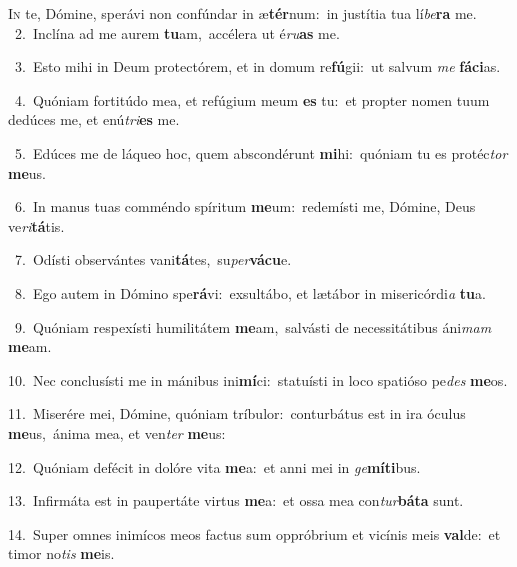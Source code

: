 \lettrine{\initial\textcolor{\initialcolor}{I}}{n} te, Dómine, sperávi non confúndar in æ\-\textbf{tér}\-num:~\star in justítia tua lí\-\textit{be}\-\textbf{ra} me.\\
{\numbfont\textcolor{\numbcolor}{~2.}}~Inclína ad me aurem \textbf{tu}\-am,~\star accélera ut é\-\textit{ru}\-\textbf{as} me.\par
{\numbfont\textcolor{\numbcolor}{~3.}}~Esto mihi in Deum protectórem, et in domum re\-\textbf{fú}\-gii:~\star ut salvum \textit{me} \textbf{fá}\-\textbf{ci}as.\par
{\numbfont\textcolor{\numbcolor}{~4.}}~Quóniam fortitúdo mea, et refúgium meum \textbf{es} tu:~\star et propter nomen tuum dedúces me, et enú\-\textit{tri}\-\textbf{es} me.\par
{\numbfont\textcolor{\numbcolor}{~5.}}~Edúces me de láqueo hoc, quem abscondérunt \textbf{mi}\-hi:~\star quóniam tu es protéc\textit{tor} \textbf{me}\-us.\par
{\numbfont\textcolor{\numbcolor}{~6.}}~In manus tuas comméndo spíritum \textbf{me}\-um:~\star redemísti me, Dómine, Deus ve\-\textit{ri}\-\textbf{tá}tis.\par
{\numbfont\textcolor{\numbcolor}{~7.}}~Odísti observántes vani\-\textbf{tá}\-tes,~\star su\-\textit{per}\-\textbf{vá}\textbf{cu}e.\par
{\numbfont\textcolor{\numbcolor}{~8.}}~Ego autem in Dómino spe\-\textbf{rá}\-vi:~\star exsultábo, et lætábor in misericórdi\textit{a} \textbf{tu}\-a.\par
{\numbfont\textcolor{\numbcolor}{~9.}}~Quóniam respexísti humilitátem \textbf{me}\-am,~\star salvásti de necessitátibus áni\textit{mam} \textbf{me}\-am.\par
{\numbfont\textcolor{\numbcolor}{10.}}~Nec conclusísti me in mánibus ini\-\textbf{mí}\-ci:~\star statuísti in loco spatióso pe\textit{des} \textbf{me}\-os.\par
{\numbfont\textcolor{\numbcolor}{11.}}~Miserére mei, Dómine, quóniam tríbulor:~\dagger conturbátus est in ira óculus \textbf{me}\-us,~\star ánima mea, et ven\textit{ter} \textbf{me}\-us:\par
{\numbfont\textcolor{\numbcolor}{12.}}~Quóniam defécit in dolóre vita \textbf{me}\-a:~\star et anni mei in \textit{ge}\-\textbf{mí}\textbf{ti}bus.\par
{\numbfont\textcolor{\numbcolor}{13.}}~Infirmáta est in paupertáte virtus \textbf{me}\-a:~\star et ossa mea con\-\textit{tur}\-\textbf{bá}\textbf{ta} sunt.\par
{\numbfont\textcolor{\numbcolor}{14.}}~Super omnes inimícos meos factus sum oppróbrium et vicínis meis \textbf{val}\-de:~\star et timor no\textit{tis} \textbf{me}\-is.\par
